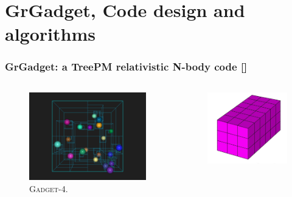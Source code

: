 \documentclass{beamer}
\makeatletter
\newcommand{\mylabel}{%
   [\beamer@againname]}
\newcommand{\gadget}{\textsc{Gadget-4}}
\makeatother
\begin{document}
\section{GrGadget, Code design and algorithms}
\frame{\sectionpage}

\begin{frame}[label=octtreepm]
    \frametitle{GrGadget: a TreePM relativistic N-body code\mylabel}
    \begin{columns}
        \begin{column}{.5\textwidth}
	\vspace*{\fill}
            \begin{figure}
                \includegraphics[height=.5\textheight]{images/octree.png}
                \caption{\gadget.}
            \end{figure}
        \end{column}
        \begin{column}{.5\textwidth}
	\vspace*{\fill}
            \begin{figure}
                \includegraphics[height=.5\textheight]{images/cubic-grid.jpeg}

\end{figure}
\end{column}
\end{columns}
\end{frame}
\end{document}
